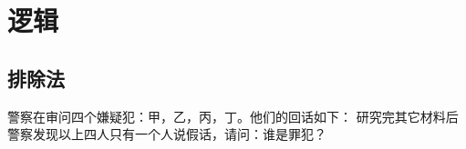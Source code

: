 
\chapter{逻辑}
\label{chap:logic}
\def\BKC{\cellcolor{gray!50}}   %

\section{排除法}
\begin{example}
  警察在审问四个嫌疑犯：甲，乙，丙，丁。他们的回话如下：
  研究完其它材料后警察发现以上四人只有一个人说假话，请问：谁是罪犯？
\end{example}
